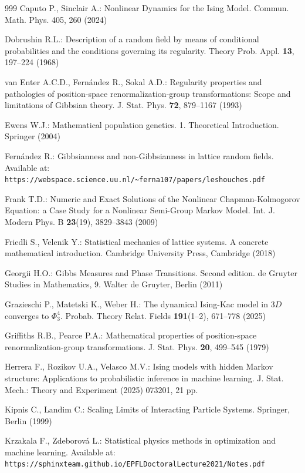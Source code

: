 \documentclass[11pt,reqno]{amsart}
\numberwithin{equation}{section} \setcounter{tocdepth}{1}
\begin{document}
\begin{thebibliography}{999}
 Caputo P., Sinclair A.: Nonlinear Dynamics for the Ising Model. Commun. Math. Phys. 405, 260 (2024)

 Dobrushin R.L.: Description of a random field by means of conditional probabilities and the conditions governing its regularity. 
Theory Prob. Appl. \textbf{13}, 197--224 (1968)

 van Enter A.C.D., Fern\'andez R., Sokal A.D.: Regularity properties and pathologies of position-space renormalization-group transformations: Scope and limitations of Gibbsian theory. 
J. Stat. Phys. \textbf{72}, 879--1167 (1993)

 Ewens W.J.: Mathematical population genetics. 1. Theoretical Introduction. 
Springer (2004)

 Fern\'andez R.: Gibbsianness and non-Gibbsianness in lattice random fields. 
Available at: \texttt{https://webspace.science.uu.nl/\~{}ferna107/papers/leshouches.pdf}

 Frank T.D.: Numeric and Exact Solutions of the Nonlinear Chapman-Kolmogorov Equation: a Case Study for a Nonlinear Semi-Group Markov Model. 
Int. J. Modern Phys. B \textbf{23}(19), 3829--3843 (2009)

 Friedli S., Velenik Y.: Statistical mechanics of lattice systems. A concrete mathematical introduction. 
Cambridge University Press, Cambridge (2018)

 Georgii H.O.: Gibbs Measures and Phase Transitions. 
Second edition. de Gruyter Studies in Mathematics, 9. Walter de Gruyter, Berlin (2011)

 Grazieschi P., Matetski K., Weber H.: The dynamical Ising-Kac model in $3D$ converges to $\Phi^4_3$. 
Probab. Theory Relat. Fields \textbf{191}(1--2), 671--778 (2025)

 Griffiths R.B., Pearce P.A.: Mathematical properties of position-space renormalization-group transformations. 
J. Stat. Phys. \textbf{20}, 499--545 (1979)

 Herrera F., Rozikov U.A., Velasco M.V.: Ising models with hidden Markov structure: Applications to probabilistic inference in machine learning. 
J. Stat. Mech.: Theory and Experiment (2025) 073201, 21 pp.

 Kipnis C., Landim C.: Scaling Limits of Interacting Particle Systems. 
Springer, Berlin (1999)

 Krzakala F., Zdeborov\'a L.: Statistical physics methods in optimization and machine learning. 
Available at: \texttt{https://sphinxteam.github.io/EPFLDoctoralLecture2021/Notes.pdf}


\end{thebibliography}
\end{document}
